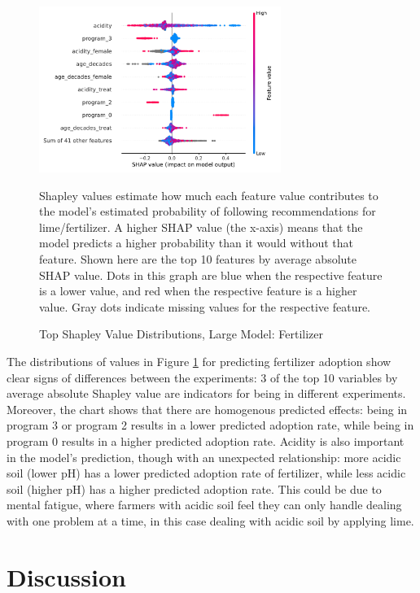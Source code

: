 \documentclass[12pt]{article}
\begin{document}
\begin{figure}[H]
    \centering
    \caption{Top Shapley Value Distributions, Large Model: Fertilizer}
    \includegraphics[width=0.7\textwidth]{../output/shap_beeswarm_fert.pdf}
    \begin{minipage}{0.7\textwidth}
    \tiny
    Shapley values estimate how much each feature value contributes to the model's estimated probability of following recommendations for lime/fertilizer. A higher SHAP value (the x-axis) means that the model predicts a higher probability than it would without that feature. Shown here are the top 10 features by average absolute SHAP value. Dots in this graph are blue when the respective feature is a lower value, and red when the respective feature is a higher value. Gray dots indicate missing values for the respective feature.
    \end{minipage}
    \label{fig:shap_fert}
\end{figure}

The distributions of values in Figure \ref{fig:shap_fert} for predicting fertilizer adoption show clear signs of differences between the experiments: 3 of the top 10 variables by average absolute Shapley value are indicators for being in different experiments. Moreover, the chart shows that there are homogenous predicted effects: being in program 3 or program 2 results in a lower predicted adoption rate, while being in program 0 results in a higher predicted adoption rate. Acidity is also important in the model's prediction, though with an unexpected relationship: more acidic soil (lower pH) has a lower predicted adoption rate of fertilizer, while less acidic soil (higher pH) has a higher predicted adoption rate. This could be due to mental fatigue, where farmers with acidic soil feel they can only handle dealing with one problem at a time, in this case dealing with acidic soil by applying lime.

\section{Discussion}
\label{section:discussion}
\end{document}
